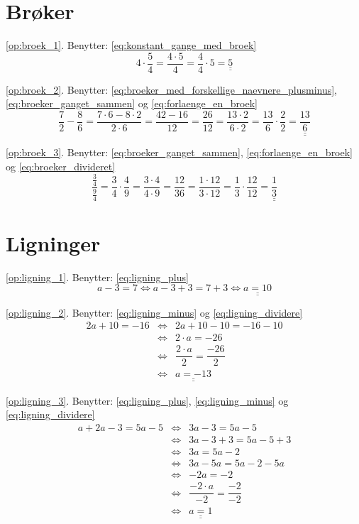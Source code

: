 \documentclass[11pt,a5paper,fleqn,leqno]{book}
\begin{document}
\section{Brøker}

\ref{op:broek_1}. Benytter: \eqref{eq:konstant_gange_med_broek}
\[4 \cdot \frac{5}{4} = \frac{4 \cdot 5}{4} = \frac{4}{4} \cdot 5 = \underline{\underline{5}}\]

\ref{op:broek_2}. Benytter: \eqref{eq:broeker_med_forskellige_naevnere_plusminus}, \eqref{eq:broeker_ganget_sammen} og \eqref{eq:forlaenge_en_broek}
\[\frac{7}{2} - \frac{8}{6} = \frac{7 \cdot 6 - 8 \cdot 2}{2 \cdot 6} = \frac{42 - 16}{12} = \frac{26}{12} = \frac{13 \cdot 2}{6 \cdot 2} = \frac{13}{6} \cdot \frac{2}{2} = \underline{\underline{\frac{13}{6}}}\]

\ref{op:broek_3}. Benytter: \eqref{eq:broeker_ganget_sammen}, \eqref{eq:forlaenge_en_broek} og \eqref{eq:broeker_divideret}
\[\frac{\frac{3}{4}}{\frac{9}{4}} = \frac{3}{4} \cdot \frac{4}{9} = \frac{3 \cdot 4}{4 \cdot 9} = \frac{12}{36} = \frac{1 \cdot 12}{3 \cdot 12} = \frac{1}{3} \cdot \frac{12}{12} = \underline{\underline{\frac{1}{3}}}\]

\section{Ligninger}

\ref{op:ligning_1}. Benytter: \eqref{eq:ligning_plus}
\[a-3=7 \Leftrightarrow a-3+3=7+3 \Leftrightarrow \underline{\underline{a = 10}}\]

\ref{op:ligning_2}. Benytter: \eqref{eq:ligning_minus} og \eqref{eq:ligning_dividere}
\begin{displaymath}\begin{array}{rcl}
2a+10=-16 & \Leftrightarrow & 2a+10-10=-16-10 \\
          & \Leftrightarrow & 2 \cdot a = -26 \\
          & \Leftrightarrow & \dfrac{2 \cdot a}{2} = \dfrac{-26}{2} \\
          & \Leftrightarrow & \underline{\underline{a = -13}}
\end{array}\end{displaymath}

\ref{op:ligning_3}. Benytter: \eqref{eq:ligning_plus}, \eqref{eq:ligning_minus} og \eqref{eq:ligning_dividere}
\begin{displaymath}\begin{array}{rcl}
a+2a-3 = 5a -5 & \Leftrightarrow & 3a-3 = 5a-5 \\
               & \Leftrightarrow & 3a-3+3 = 5a-5+3 \\
               & \Leftrightarrow & 3a = 5a-2 \\
               & \Leftrightarrow & 3a - 5a = 5a-2-5a \\
               & \Leftrightarrow & -2a = -2 \\
               & \Leftrightarrow & \dfrac{-2 \cdot a}{-2} = \dfrac{-2}{-2} \\
               & \Leftrightarrow & \underline{\underline{a = 1}}
\end{array}\end{displaymath}
\end{document}
